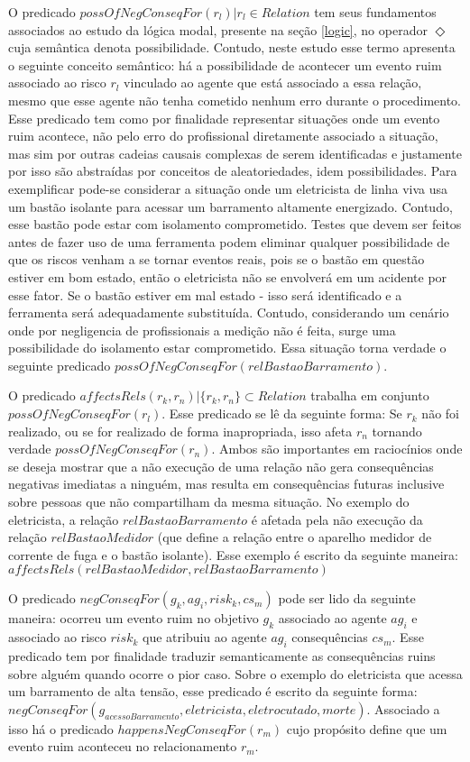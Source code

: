 O predicado $possOfNegConseqFor(r_l) | r_l \in Relation $ tem seus fundamentos associados ao estudo da lógica modal, presente na seção \ref{logic}, no operador $\Diamond$ cuja semântica denota possibilidade. Contudo, neste estudo esse termo apresenta o seguinte conceito semântico: há a possibilidade de acontecer um evento ruim associado ao risco $r_l$ vinculado ao agente que está associado a essa relação, mesmo que esse agente não tenha cometido nenhum erro durante o procedimento. Esse predicado tem como por finalidade representar situações onde um evento ruim acontece, não pelo erro do profissional diretamente associado a situação, mas sim por outras cadeias causais complexas de serem identificadas e justamente por isso são abstraídas por conceitos de aleatoriedades, idem possibilidades. Para exemplificar pode-se considerar a situação onde um eletricista de linha viva usa um bastão isolante para acessar um barramento altamente energizado. Contudo, esse bastão pode estar com isolamento comprometido. Testes que devem ser feitos antes de fazer uso de uma ferramenta podem eliminar qualquer possibilidade de que os riscos venham a se tornar eventos reais, pois se o bastão em questão estiver em bom estado, então o eletricista não se envolverá em um acidente por esse fator. Se o bastão estiver em mal estado - isso será identificado e a ferramenta será adequadamente substituída. Contudo, considerando um cenário onde por negligencia de profissionais a medição não é feita, surge uma possibilidade do isolamento estar comprometido. Essa situação torna verdade o seguinte predicado $possOfNegConseqFor(relBastaoBarramento)$.

O predicado $affectsRels(r_k,r_n) | \{ r_k, r_n\} \subset Relation $ trabalha em conjunto $possOfNegConseqFor(r_l)$. Esse predicado se lê da seguinte forma: Se $r_k$ não foi realizado, ou se for realizado de forma inapropriada, isso afeta  $r_n$ tornando verdade $possOfNegConseqFor(r_n)$. Ambos são importantes em raciocínios onde se deseja mostrar que a não execução de uma relação não gera consequências negativas imediatas a ninguém, mas resulta em consequências futuras inclusive sobre pessoas que não compartilham da mesma situação. No exemplo do eletricista, a relação $relBastaoBarramento$ é afetada pela não execução da relação $relBastaoMedidor$ (que define a relação entre o aparelho medidor de corrente de fuga e o bastão isolante). Esse exemplo é escrito da seguinte maneira:$affectsRels(relBastaoMedidor,relBastaoBarramento)$

O predicado $negConseqFor(g_k, ag_i,risk_k,cs_m)$ pode ser lido da seguinte maneira: ocorreu um evento ruim no objetivo $g_k$ associado ao agente $ag_i$ e associado ao risco $risk_k$ que atribuiu ao agente $ag_i$ consequências $cs_m$. Esse predicado tem por finalidade traduzir semanticamente as consequências ruins sobre alguém quando ocorre o pior caso. Sobre o exemplo do eletricista que acessa um barramento de alta tensão, esse predicado é escrito da seguinte forma: $negConseqFor(g_{acessoBarramento}, eletricista,eletrocutado,morte)$. Associado a isso há o predicado $happensNegConseqFor(r_m)$ cujo propósito define que um evento ruim aconteceu no relacionamento $r_m$.

